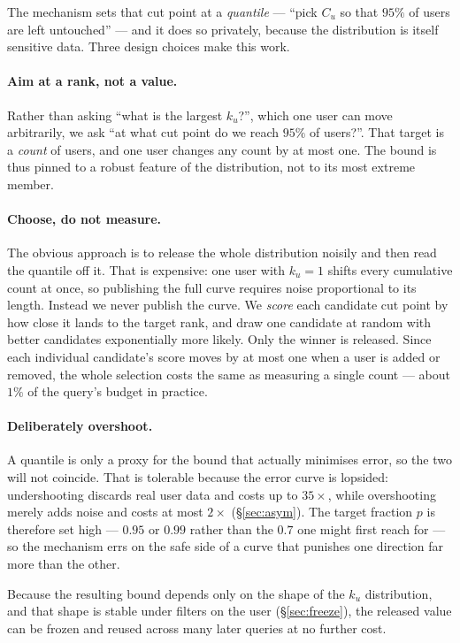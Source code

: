 \documentclass[11pt,a4paper]{article}
\newcommand{\Cu}{C_u}
\newcommand{\ku}{k_u}
\begin{document}
The mechanism sets that cut point at a \emph{quantile} --- ``pick $\Cu$ so that $95\%$ of users are
left untouched'' --- and it does so privately, because the distribution is itself sensitive data.
Three design choices make this work.

\paragraph{Aim at a rank, not a value.} Rather than asking ``what is the largest $\ku$?'', which one
user can move arbitrarily, we ask ``at what cut point do we reach $95\%$ of users?''. That target is
a \emph{count} of users, and one user changes any count by at most one. The bound is thus pinned to
a robust feature of the distribution, not to its most extreme member.

\paragraph{Choose, do not measure.} The obvious approach is to release the whole distribution
noisily and then read the quantile off it. That is expensive: one user with $\ku = 1$ shifts every
cumulative count at once, so publishing the full curve requires noise proportional to its length.
Instead we never publish the curve. We \emph{score} each candidate cut point by how close it lands
to the target rank, and draw one candidate at random with better candidates exponentially more
likely. Only the winner is released. Since each individual candidate's score moves by at most one
when a user is added or removed, the whole selection costs the same as measuring a single count ---
about $1\%$ of the query's budget in practice.

\paragraph{Deliberately overshoot.} A quantile is only a proxy for the bound that actually minimises
error, so the two will not coincide. That is tolerable because the error curve is lopsided:
undershooting discards real user data and costs up to $35\times$, while overshooting merely adds
noise and costs at most $2\times$ (\S\ref{sec:asym}). The target fraction $p$ is therefore set high
--- $0.95$ or $0.99$ rather than the $0.7$ one might first reach for --- so the mechanism errs on
the safe side of a curve that punishes one direction far more than the other.

Because the resulting bound depends only on the shape of the $\ku$ distribution, and that shape is
stable under filters on the user (\S\ref{sec:freeze}), the released value can be frozen and reused
across many later queries at no further cost.
\end{document}
